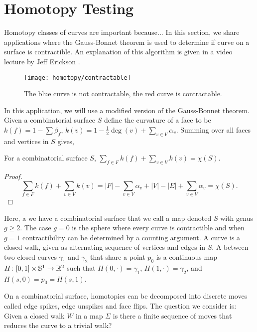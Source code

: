 \section{Homotopy Testing}
\label{sec:homotopy}

Homotopy classes of curves are important  because...
In this section, we share applications
where the Gauss-Bonnet theorem is used to determine
if curve on a surface is contractible.
An explanation of this algorithm is given in a video lecture 
by Jeff Erickson \cite{erickson-lecture}.

\begin{figure}[htb]
\centering
\texttt{[image: homotopy/contractable]}
\caption{The blue curve is not contractable, the red curve is contractable.}
\label{fig:contractable}
\end{figure}

In this application, we will use a modified version
of the Gauss-Bonnet theorem. Given a combinatorial surface
$S$ define the curvature of a face to be $k(f)=1-\sum \beta_f$,
$k(v)=1-\frac{1}{2}\deg(v)+\sum_{v\in V} \alpha_v$.
Summing over all faces and vertices in $S$ gives,
\begin{theorem}\label{thm:modify-g-b}
For a combinatorial surface $S$,
$\sum_{f\in F} k(f)+\sum_{v\in V}k(v)=\chi(S).$
\end{theorem}

\begin{proof}

$$\sum_{f\in F} k(f)+\sum_{v\in V}k(v)=|F|-\sum_{v\in V}\alpha_v + |V|-|E|+\sum_{v\in V}\alpha_v=\chi(S).$$
\end{proof}


Here, a we have a combinatorial surface that we call a map denoted $S$
with genus $g\geq 2.$ The case $g=0$ is the sphere where every curve
is contractible and when $g=1$ contractibility can be determined by a counting
argument.
A curve is a closed walk, given as alternating sequence of vertices
and edges in $S$.
A  between two closed curves $\gamma_1$ and $\gamma_2$ that 
share a point $p_0$ is a continuous map $H\colon [0,1]\times \mathbb{S}^1 \to \mathbb{R}^2$ 
such that $H(0,\cdot)=\gamma_1$, $H(1,\cdot)=\gamma_2$, and $H(s,0)=p_0=H(s,1)$.

On a combinatorial surface, homotopies can be decomposed
into discrete moves called edge spikes, edge unspikes  and face flips.
The question we consider is: Given a closed walk $W$ in a map $\Sigma$ is there a finite
sequence of moves that reduces the curve to a trivial walk?



